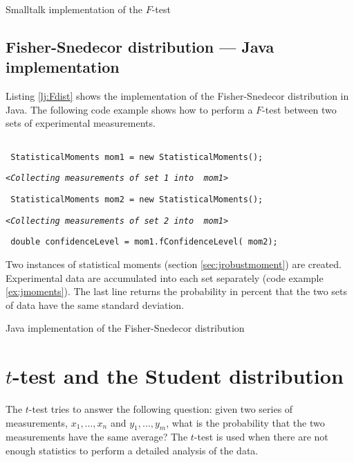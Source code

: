 \documentclass[twoside]{book}
\begin{document}
\begin{listing} Smalltalk implementation of the $F$-test \label{ls:Ftest}


\end{listing}

\subsection{Fisher-Snedecor distribution --- Java implementation}
 Listing \ref{lj:Fdist} shows
the implementation of the Fisher-Snedecor distribution in Java.
The following code example shows how to perform a $F$-test between
two sets of experimental measurements.
\begin{codeExample}
\label{exj:Ftest}
\begin{verbatim}

 StatisticalMoments mom1 = new StatisticalMoments();
\end{verbatim}
\hfil{\tt<\sl Collecting measurements of set 1 into \tt
mom1>}\hfil
\begin{verbatim}
 StatisticalMoments mom2 = new StatisticalMoments();
\end{verbatim}
\hfil{\tt<\sl Collecting measurements of set 2 into \tt
mom1>}\hfil
\begin{verbatim}
 double confidenceLevel = mom1.fConfidenceLevel( mom2);
\end{verbatim}
\end{codeExample}
Two instances of statistical moments (\cf section
\ref{sec:jrobustmoment}) are created. Experimental data are
accumulated into each set separately (\cf code example
\ref{ex:jmoments}). The last line returns the probability in
percent that the two sets of data have the same standard
deviation.
\begin{listing} Java implementation of the Fisher-Snedecor distribution \label{lj:Fdist}

\end{listing}

\section{$t$-test and the Student distribution}
\label{sec:ttest} The $t$-test tries to answer the following
question: given two series of measurements, $x_1,\ldots,x_n$ and
$y_1,\ldots,y_m$, what is the probability that the two
measurements have the same average?  The $t$-test is used when
there are not enough statistics to perform a detailed analysis of
the data.
\end{document}
